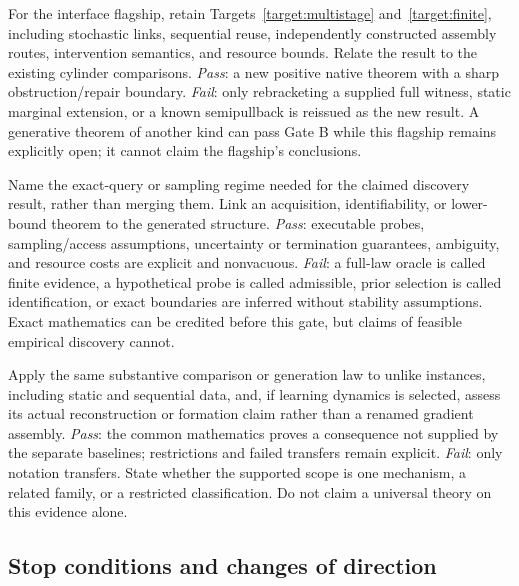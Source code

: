 \documentclass[11pt]{article}
\theoremstyle{remark}
\begin{document}
\begin{description}[style=nextline,leftmargin=0pt]
\item[Gate D \quad Establish native use where claimed]
For the interface flagship, retain Targets~\ref{target:multistage} and~\ref{target:finite}, including stochastic links, sequential reuse, independently constructed assembly routes, intervention semantics, and resource bounds. Relate the result to the existing cylinder comparisons. \emph{Pass}: a new positive native theorem with a sharp obstruction/repair boundary. \emph{Fail}: only rebracketing a supplied full witness, static marginal extension, or a known semipullback is reissued as the new result. A generative theorem of another kind can pass Gate B while this flagship remains explicitly open; it cannot claim the flagship's conclusions.

\item[Gate E \quad Establish the claimed empirical warrant]
Name the exact-query or sampling regime needed for the claimed discovery result, rather than merging them. Link an acquisition, identifiability, or lower-bound theorem to the generated structure. \emph{Pass}: executable probes, sampling/access assumptions, uncertainty or termination guarantees, ambiguity, and resource costs are explicit and nonvacuous. \emph{Fail}: a full-law oracle is called finite evidence, a hypothetical probe is called admissible, prior selection is called identification, or exact boundaries are inferred without stability assumptions. Exact mathematics can be credited before this gate, but claims of feasible empirical discovery cannot.

\item[Gate F \quad Test transfer and assess the thesis]
Apply the same substantive comparison or generation law to unlike instances, including static and sequential data, and, if learning dynamics is selected, assess its actual reconstruction or formation claim rather than a renamed gradient assembly. \emph{Pass}: the common mathematics proves a consequence not supplied by the separate baselines; restrictions and failed transfers remain explicit. \emph{Fail}: only notation transfers. State whether the supported scope is one mechanism, a related family, or a restricted classification. Do not claim a universal theory on this evidence alone.
\end{description}

\subsection{Stop conditions and changes of direction}
\end{document}
